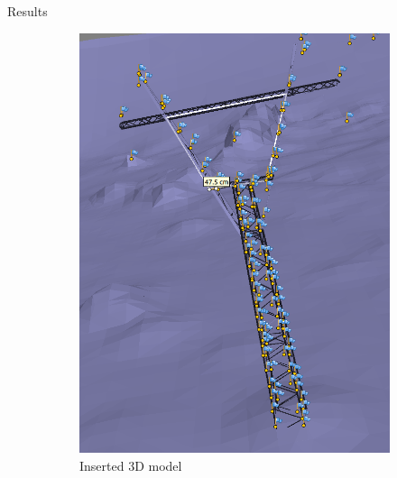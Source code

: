 \documentclass{beamer}
\begin{document}
\begin{frame}[t, fragile]{Results}
\begin{figure}
\centering
\begin{subfigure}{.5\textwidth}
\centering
\includegraphics[scale=0.15]{results_cool}
\caption{Inserted 3D model}
\end{subfigure}%
\begin{subfigure}{.5\textwidth}

\end{subfigure}
\end{figure}
\end{frame}
\end{document}
